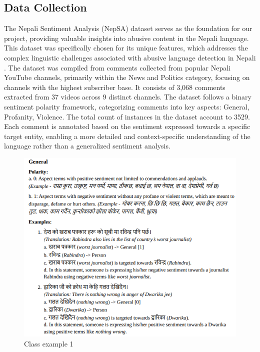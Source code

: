 \subsection{Data Collection}
The Nepali Sentiment Analysis (NepSA) dataset serves as the foundation for our project, providing valuable insights into abusive content in the Nepali language. This dataset was specifically chosen for its unique features, which addresses the complex linguistic challenges associated with abusive language detection in Nepali \cite{singh2020aspect}.
The dataset was compiled from comments collected from popular Nepali YouTube channels, primarily within the News and Politics category, focusing on channels with the highest subscriber base. It consists of 3,068 comments extracted from 37 videos across 9 distinct channels. The dataset follows a binary sentiment polarity framework, categorizing comments into key aspects: General, Profanity, Violence. The total count of instances in the dataset account to 3529. Each comment is annotated based on the sentiment expressed towards a specific target entity, enabling a more detailed and context-specific understanding of the language rather than a generalized sentiment analysis.
\begin{figure}[h]
\centering
\includegraphics[scale=0.65]{images/1.png}
\caption{Class example 1}
\end{figure}

\newpage

